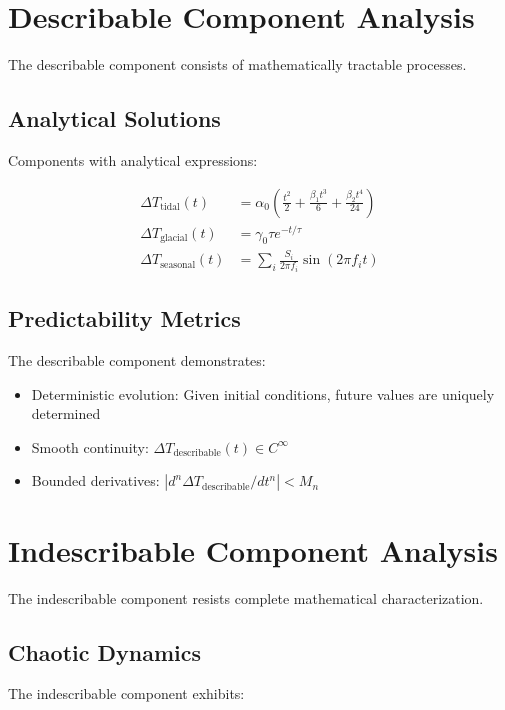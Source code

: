 \documentclass[12pt,a4paper]{report}
\begin{document}
\section{Describable Component Analysis}

The describable component consists of mathematically tractable processes.

\subsection{Analytical Solutions}

Components with analytical expressions:

\begin{align*}
\Delta T_{\text{tidal}}(t) &= \alpha_0 \left(\frac{t^2}{2} + \frac{\beta_1 t^3}{6} + \frac{\beta_2 t^4}{24}\right) \\
\Delta T_{\text{glacial}}(t) &= \gamma_0 \tau e^{-t/\tau} \\
\Delta T_{\text{seasonal}}(t) &= \sum_{i} \frac{S_i}{2\pi f_i} \sin(2\pi f_i t)
\end{align*}

\subsection{Predictability Metrics}

The describable component demonstrates:

\begin{itemize}
\item Deterministic evolution: Given initial conditions, future values are uniquely determined
\item Smooth continuity: $\Delta T_{\text{describable}}(t) \in C^\infty$
\item Bounded derivatives: $|d^n \Delta T_{\text{describable}}/dt^n| < M_n$
\end{itemize}

\section{Indescribable Component Analysis}

The indescribable component resists complete mathematical characterization.

\subsection{Chaotic Dynamics}

The indescribable component exhibits:
\end{document}

